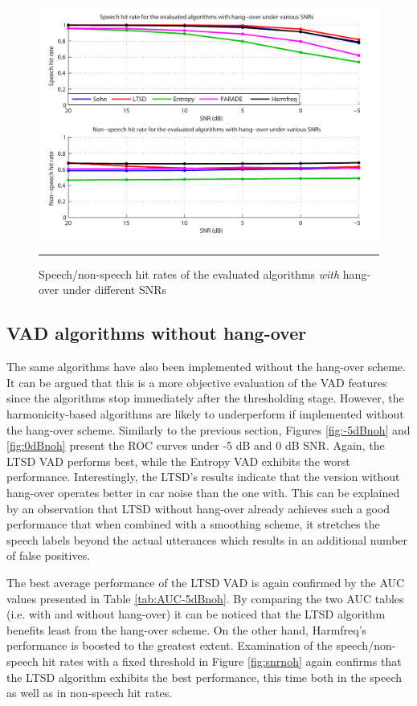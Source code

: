 \begin{figure}[htbp]
	\centering
		\includegraphics[width=0.9\columnwidth]{Figures/Chapter4/snrhbold.pdf}
		\rule{37em}{0.5pt}
	\caption[Speech/non-speech hit rates of the evaluated algorithms \emph{with} hang-over under different SNRs]{Speech/non-speech hit rates of the evaluated algorithms \emph{with} hang-over under different SNRs}
	\label{fig:snrh}
\end{figure}

\subsection{VAD algorithms without hang-over}

The same algorithms have also been implemented without the hang-over scheme. It can be argued that this is a more objective evaluation of the VAD features since the algorithms stop immediately after the thresholding stage. However, the harmonicity-based algorithms are likely to underperform if implemented without the hang-over scheme. Similarly to the previous section, Figures \ref{fig:-5dBnoh} and \ref{fig:0dBnoh} present the ROC curves under -5 dB and 0 dB SNR. Again, the LTSD VAD performs best, while the Entropy VAD exhibits the worst performance. Interestingly, the LTSD's results indicate that the version without hang-over operates better in car noise than the one with. This can be explained by an observation that LTSD without hang-over already achieves such a good performance that when combined with a smoothing scheme, it stretches the speech labels beyond the actual utterances which results in an additional number of false positives.

The best average performance of the LTSD VAD is again confirmed by the AUC values presented in Table \ref{tab:AUC-5dBnoh}. By comparing the two AUC tables (i.e. with and without hang-over) it can be noticed that the LTSD algorithm benefits least from the hang-over scheme. On the other hand, Harmfreq's performance is boosted to the greatest extent. Examination of the speech/non-speech hit rates with a fixed threshold in Figure \ref{fig:snrnoh} again confirms that the LTSD algorithm exhibits the best performance, this time both in the speech as well as in non-speech hit rates.

